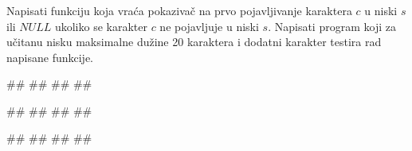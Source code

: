 

\begin{Exercise}[label=p2.3_09] 
Napisati funkciju  koja vraća pokazivač na prvo pojavljivanje karaktera $c$ u niski $s$ ili $NULL$ ukoliko se karakter $c$ ne pojavljuje u niski $s$. Napisati program koji za učitanu nisku maksimalne dužine 20 karaktera i dodatni karakter testira rad napisane funkcije. 
 
\begin{miditest}
\begin{upotreba}{1}
#\naslovInt#
##
##
##
\end{upotreba}
\end{miditest}
\begin{minitest}
\begin{upotreba}{2}
#\naslovInt#
##
##
##
\end{upotreba}
\end{minitest}

\begin{minitest}
\begin{upotreba}{3}
#\naslovInt#
##
##
##
\end{upotreba}
\end{minitest}
\end{Exercise}
\begin{Answer}[ref=p2.3_09]
\end{Answer}

